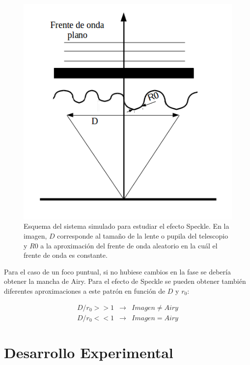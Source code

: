 \documentclass[twoside]{article}
\begin{document}
				\begin{figure}[H]
					\centering
					\includegraphics[scale=0.25]{Esquema.png}
					\caption{\label{Img:Esquema}Esquema del sistema simulado para estudiar el efecto Speckle. En la imagen, $D$ corresponde al tamaño de la lente o pupila del telescopio y $R0$ a la aproximación del frente de onda aleatorio en la cuál el frente de onda es constante.}
				\end{figure}

				\newpage

			Para el caso de un foco puntual, si no hubiese cambios en la fase se debería obtener la mancha de Airy. Para el efecto de Speckle se pueden obtener también diferentes aproximaciones a este patrón en función de $D$ y $r_0$:

				\begin{equation}
					\begin{matrix}
						D/r_0 >> 1 & \rightarrow & Imagen \neq Airy
						\\
						D/r_0 << 1 & \rightarrow & Imagen=Airy
					\end{matrix}
					\label{eq:airy}
				\end{equation}

		\section{Desarrollo Experimental}
\end{document}
